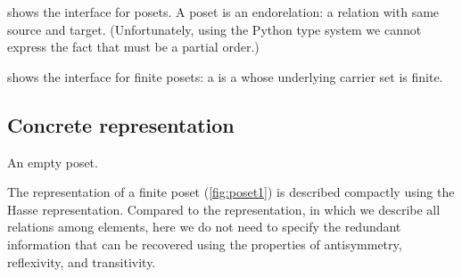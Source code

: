 

 shows the interface for posets.
A poset is an endorelation: a relation with same source and target.
(Unfortunately, using the Python type system we cannot express the fact that  must be a partial order.)

 shows the interface for finite posets: a  is a  whose underlying carrier set is finite.




\begin{figure}[h!]
    \caption{}
    \label{fig:poset-finiteposet}
\end{figure}

\subsection{Concrete representation}
\begin{marginfigure}
    \caption{}
    \label{fig:poset1}
\end{marginfigure}
\begin{marginfigure}
    \caption{An empty poset.}
    \label{fig:poset_empty}
\end{marginfigure}

The representation of a finite poset (\cref{fig:poset1}) is described compactly using the Hasse representation.
Compared to the  representation, in which we describe all relations among elements, here we do not need to specify the redundant information that can be recovered using the properties of antisymmetry, reflexivity, and transitivity.


